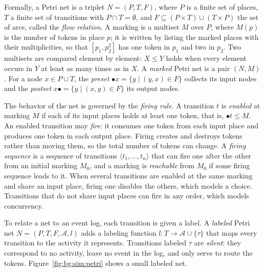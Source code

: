     Formally, a Petri net is a triplet $N = (P, T, F)$, where $P$ is a finite set
    of places, $T$ a finite set of transitions with $P \cap T = \emptyset$, and
    $F \subseteq (P \times T) \cup (T \times P)$ the set of arcs, called the
    \emph{flow relation}. A marking is a multiset $M$ over $P$, where $M(p)$ is
    the number of tokens in place $p$; it is written by listing the marked places
    with their multiplicities, so that $[p_1, p_2^{2}]$ has one token in $p_1$ and
    two in $p_2$. Two multisets are compared element by element: $X \le Y$ holds
    when every element occurs in $Y$ at least as many times as in
    $X$. A \emph{marked} Petri net is a pair $(N, M)$.
    For a node
    $x \in P \cup T$, the \emph{preset} $\bullet x = \{ y \mid (y, x) \in F \}$
    collects its input nodes and the \emph{postset} $x \bullet = \{ y \mid (x, y)
    \in F \}$ its output nodes.
    
    The behavior of the net is governed by the \emph{firing rule}. A transition
    $t$ is \emph{enabled} at marking $M$ if each of its input places holds at
    least one token, that is, $\bullet t \le M$. An enabled transition may
    \emph{fire}: it consumes one token from each input place and produces one
    token in each output place.
    Firing creates and destroys tokens rather than moving them, so the total
    number of tokens can change. A \emph{firing sequence} is a sequence of
    transitions $\langle t_1, \dots, t_n \rangle$ that can fire one after the
    other from an initial marking $M_0$, and a marking is \emph{reachable} from
    $M_0$ if some firing sequence leads to it. When several
    transitions are enabled at the same marking and share an input place, firing
    one disables the others, which models a choice. Transitions that do not share
    input places can fire in any order, which models
    concurrency.
    
    To relate a net to an event log, each transition is given a label. A
    \emph{labeled} Petri net $N = (P, T, F, \mathcal{A}, l)$ adds a labeling
    function $l : T \to \mathcal{A} \cup \{\tau\}$ that maps every transition to
    the activity it represents. Transitions labeled $\tau$ are \emph{silent}: they
    correspond to no activity, leave no event in the log, and only serve to route
    the tokens. Figure~\ref{fig:bg:sim:petri} shows a small
    labeled net.
    
